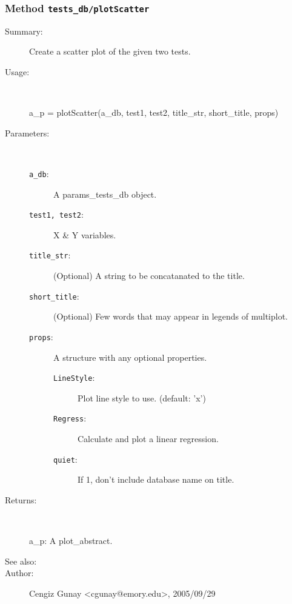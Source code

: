 \subsubsection[Method \texttt{plotScatter}]{Method \texttt{tests\_db/plotScatter}}%
%
\label{ref_tests_db__plotScatter}%
\hypertarget{ref_tests_db__plotScatter}{}%
\begin{description}
\item[Summary:]Create a scatter plot of the given two tests.
%
\item[Usage:]~%
\begin{lyxcode}%
a\_p = plotScatter(a\_db, test1, test2, title\_str, short\_title, props)
%
\end{lyxcode}%
%
%
\item[Parameters:]~
\begin{description}%
\item[\texttt{a\_db}:]
 A params\_tests\_db object.
\item[\texttt{test1, test2}:]
 X \& Y variables.
\item[\texttt{title\_str}:]
 (Optional) A string to be concatanated to the title.
\item[\texttt{short\_title}:]
 (Optional) Few words that may appear in legends of multiplot.
\item[\texttt{props}:]
 A structure with any optional properties.
\begin{description}%
\item[\texttt{LineStyle}:]
 Plot line style to use. (default: 'x')
\item[\texttt{Regress}:]
 Calculate and plot a linear regression.
\item[\texttt{quiet}:]
 If 1, don't include database name on title.
\end{description}%
\end{description}%
%
\item[Returns:]~

	a\_p: A plot\_abstract.
%
%
\item[See also:]%
%
\item[Author:]%
Cengiz Gunay <cgunay@emory.edu>, 2005/09/29%
\end{description}
\methodline%
